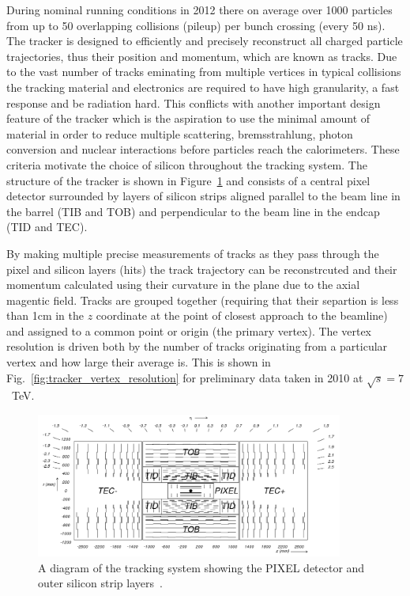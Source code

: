 During nominal \LHC running conditions in 2012 there on average over 1000 particles from up to 50 overlapping \pp collisions (pileup) per bunch crossing (every 50 ns). The tracker is designed to efficiently and precisely reconstruct all charged particle trajectories, thus their position and momentum, which are known as tracks. Due to the vast number of tracks eminating from multiple vertices in typical \LHC collisions the tracking material and electronics are required to have high granularity, a fast response and be radiation hard. This conflicts with another important design feature of the tracker which is the aspiration to use the minimal amount of material in order to reduce multiple scattering, bremsstrahlung, photon conversion and nuclear interactions before particles reach the calorimeters. These criteria motivate the choice of silicon throughout the \CMS tracking system. The structure of the \CMS tracker is shown in Figure~\ref{fig:cms_tracker} and consists of a central pixel detector surrounded by layers of silicon strips aligned parallel to the beam line in the barrel (TIB and TOB) and perpendicular to the beam line in the endcap (TID and TEC).

By making multiple precise measurements of tracks as they pass through the pixel and silicon layers (hits) the track trajectory can be reconstrcuted and their momentum calculated using their curvature in the \phi plane due to the axial magentic field. Tracks are grouped together (requiring that their separtion is less than 1cm in the $z$ coordinate at the point of closest approach to the beamline) and assigned to a common point or origin (the primary vertex). The vertex resolution is driven both by the number of tracks originating from a particular vertex and how large their average \pT is. This is shown in Fig.~\ref{fig:tracker_vertex_resolution} for preliminary data taken in 2010 at $\sqrt{s}=7$~TeV.

\begin{figure}
  \includegraphics[width=0.9\textwidth]{ch2_cms_exp/plots/fig_cmstracker.png}
  \caption[CMS tracker]{A diagram of the \CMS tracking system showing the PIXEL detector and outer silicon strip layers~\cite{CMS_JINST}.}
  \label{fig:cms_tracker}
\end{figure}

